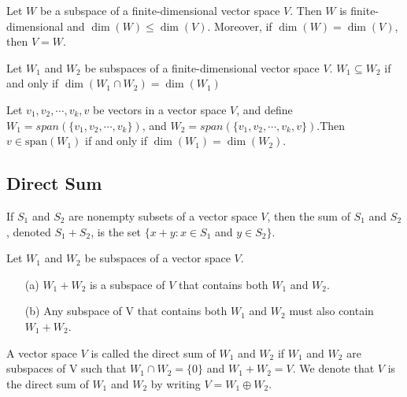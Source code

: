 \begin{thm} %
Let $W$ be a subspace of a finite-dimensional vector space $V$. Then $W$ is finite-dimensional and $\dim(W) \leq \dim(V)$. Moreover, if $\dim(W) = \dim(V)$, then $V = W$.
\end{thm}
\pfshow{}

\begin{tcolorbox}
	\begin{prop} %
	Let $W_1$ and $W_2$ be subspaces of a finite-dimensional vector space $V$. $W_1 \subseteq W_2$ if and only if $\dim(W_1 \cap W_2) = \dim(W_1)$
\end{prop}
\pfshow{} 


\begin{thm} %
Let $v_1, v_2, \cdots , v_k, v$ be vectors in a vector space $V$, and define $W_1 = span(\{v_1, v_2, \cdots , v_k\})$, and $W_2 = span(\{v_1, v_2, \cdots , v_k , v \})$.Then $v \in \mathrm{span}(W_1)$ if and only if $\dim(W_1) = \dim(W_2)$.
\end{thm}
%
\end{tcolorbox}

\subsection{Direct Sum}

\begin{defn} %
	If $S_1$ and $S_2$ are nonempty subsets of a vector space $V$, then the sum of $S_1$ and $S_2$, denoted $S_1 + S_2$, is the set $\{x+y:x \in S_1$ and $y\in S_2\}$.
\end{defn}

\begin{thm} %
	Let $W_1$ and $W_2$ be subspaces of a vector space $V$.
	\begin{itemize}
		\item[(a)] $W_1 + W_2$ is a subspace of $V$ that contains both $W_1$ and $W_2$.
		\item[(b)] Any subspace of V that contains both $W_1$ and $W_2$ must also contain $W_1 + W_2$. 
	\end{itemize}
\end{thm}
\pfshow{}


\begin{defn} 

A vector space $V$ is called the direct sum of $W_1$ and $W_2$ if $W_1$ and $W_2$ are subspaces of V such that $W_1 \cap W_2 = \{0\}$ and $W_1 + W_2 = V$. We denote that $V$ is the direct sum of $W_1$ and $W_2$ by writing $V = W_1 \oplus W_2$.
\end{defn}

